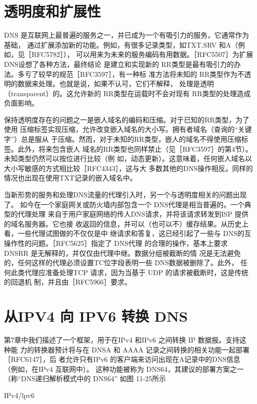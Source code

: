 \section{透明度和扩展性}

DNS 是互联网上最普遍的服务之一，并已成为一个有吸引力的服务，它通常作为基础，
通过扩展添加新的功能。例如，有很多记录类型，如TXT.SRV 和A（例如，见［RFC5782］），
可以用来为未来的服务编码有用数据。［RFC5507］为扩展 DNS设想了各种方法，最终结论
是建立和实现新的 RR类型是最有吸引力的办法。多亏了较早的规范［RFC3597］，有一种标
准方法将未知的 RR类型作为不透明的数据来处理。也就是说，如果不认可，它们不解释，
处理是透明（transparent）的。这允许新的 RR类型在运载时不会对现有 RR类型的处理造成
负面影响。

保持透明度存在的问题之一是嵌人域名的编码和压缩。对于已知的RR类型，为了使用
压缩标签实现压缩，允许改变嵌入域名的大小写。拥有者域名（查询的“关键字”）总是服从
于压缩。然而，对于未知的RR类型，嵌人的域名不得使用压缩标签。此外，将来包含嵌人
域名的RR类型也同样禁止（见［RFC3597］的第4节）。未知类型仍然可以按位进行比较（例
如，动态更新）。这意味着，任何嵌人域名以大小写敏感的方式相比较［RFC4343］，这与大
多数其他的DNS操作相反。同样的情况也出现在使用TXT记录的嵌入域名中。

当新形势的服务和处理DNS流量的代理引入时，另一个与透明度相关的问题出现了。
如今在一个家庭网关或防火墙内部包含一个 DNS代理是相当普遍的。一个典型的代理处理
来自于用户家庭网络的传人DNS请求，并将该请求转发到ISP 提供的域名服务器。它也接
收返回的信息，并可以（也可以不）缓存结果。从历史上看，一些代理试图做的不仅仅是中
继请求和答复，这已经引起了一些与 DNS的互操作性的问题。［RFC5625］指定了 DNS代理
的合理的操作，基本上要求 DNSRR 是无解释的，并仅仅由代理中继。数据分组被截断的情
况是无法避免的，任何这样的代理必须设置TC位字段表明一些 DNS数据被删除了。此外，
任何此类代理应准备处理TCP 请求，因为当基于 UDP 的请求被截断时，这是传统的回退机
制，并且由［RFC5966］要求。

\section{从IPV4 向 IPV6 转换 DNS}

第7章中我们描述了一个框架，用于在IPv4 和IPv6 之间转换 IP 数据报。支持这种能
力的转换器预计将与在 DNSA 和 AAAA 记录之间转换的相关功能一起部署［RFC6147］，后
者允许只有IPv6 的客户端来访问出现在A记录中的DNS信息（例如，在IPv4 互联网中）。
这种功能被称为 DNS64，其建议的部署方案之一（称“DNS递归解析模式中的 DNS64”
如图 11-25所示


IPv4/lpv6

